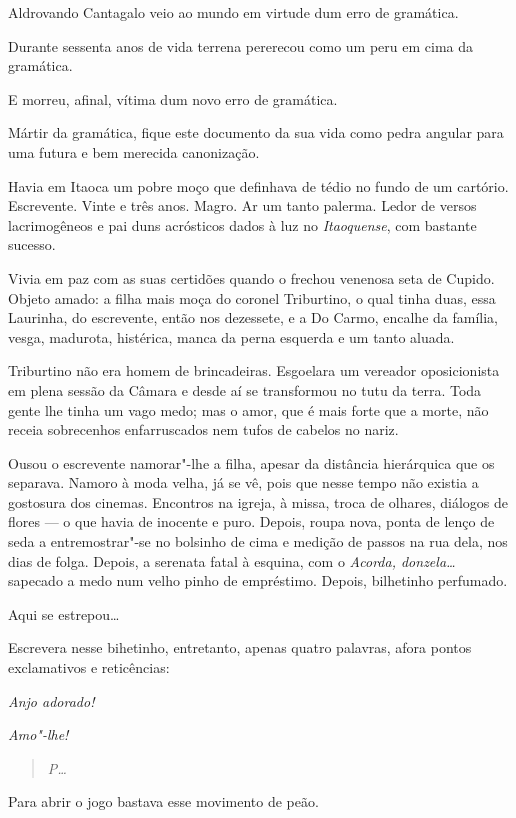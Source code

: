 Aldrovando Cantagalo veio ao mundo em virtude dum erro de gramática.

Durante sessenta anos de vida terrena pererecou como um peru em cima da
gramática.

E morreu, afinal, vítima dum novo erro de gramática.

Mártir da gramática, fique este documento da sua vida como pedra angular
para uma futura e bem merecida canonização.

Havia em Itaoca um pobre moço que definhava de tédio no fundo de um
cartório. Escrevente. Vinte e três anos. Magro. Ar um tanto palerma.
Ledor de versos lacrimogêneos e pai duns acrósticos dados à luz no
\emph{Itaoquense}, com bastante sucesso.

Vivia em paz com as suas certidões quando o frechou venenosa seta de
Cupido. Objeto amado: a filha mais moça do coronel Triburtino, o qual
tinha duas, essa Laurinha, do escrevente, então nos dezessete, e a Do
Carmo, encalhe da família, vesga, madurota, histérica, manca da perna
esquerda e um tanto aluada.

Triburtino não era homem de brincadeiras. Esgoelara um vereador
oposicionista em plena sessão da Câmara e desde aí se transformou no
tutu da terra. Toda gente lhe tinha um vago medo; mas o amor, que é mais
forte que a morte, não receia sobrecenhos enfarruscados nem tufos de
cabelos no nariz.

Ousou o escrevente namorar"-lhe a filha, apesar da distância hierárquica
que os separava. Namoro à moda velha, já se vê, pois que nesse tempo não
existia a gostosura dos cinemas. Encontros na igreja, à missa, troca de
olhares, diálogos de flores --- o que havia de inocente e puro. Depois,
roupa nova, ponta de lenço de seda a entremostrar"-se no bolsinho de cima
e medição de passos na rua dela, nos dias de folga. Depois, a serenata
fatal à esquina, com o
\emph{Acorda, donzela\ldots{}}
sapecado a medo num velho pinho de empréstimo. Depois, bilhetinho
perfumado.

Aqui se estrepou\ldots{}

Escrevera nesse bihetinho, entretanto, apenas quatro palavras, afora
pontos exclamativos e reticências:

\emph{Anjo adorado!}

\emph{Amo"-lhe!}

\begin{quote}
\emph{P\ldots{}}
\end{quote}

Para abrir o jogo bastava esse movimento de peão.

